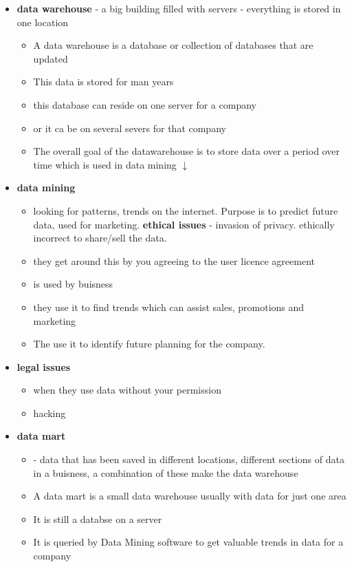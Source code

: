 \documentclass[12pt, a4, twoside]{article}
\begin{document}
\begin{center}
\begin{itemize}
    \item \textbf{data warehouse} - a big building filled with servers - everything is stored in one location 
    \begin{itemize}
      \item A data warehouse is a database or collection of databases that are updated 
      \item This data is stored for man years 
      \item this database can reside on one server for a company 
      \item or it ca be on several severs for that company 
      \item The overall goal of the datawarehouse is to store data over a period over time which is used in data mining $\downarrow$
    \end{itemize}
    \item \textbf{data mining}
    \begin{itemize}
      \item looking for patterns, trends on the internet. Purpose is to predict future data, used for marketing. \textbf{ethical issues} - invasion of privacy. ethically incorrect to share/sell the data. 
      \item they get around this by you agreeing to the user licence agreement 
      \item is used by buisness 
      \item they use it to find trends which can assist sales, promotions and marketing
      \item The use it to identify future planning for the company.
    \end{itemize}
    

    \item \textbf{legal issues}
    \begin{itemize}
      \item when they use data without your permission
      \item hacking 
    \end{itemize}
    \item \textbf{data mart}
    \begin{itemize}
      \item - data that has been saved in different locations, different sections of data in a buisness, a combination of these make the data warehouse
      \item A data mart is a small data warehouse usually with data for just one area 
      \item It is still a databse on a server
      \item It is queried by Data Mining software to get valuable trends in data for a company 
    \end{itemize}
    


\end{itemize}
\end{center}
\end{document}
